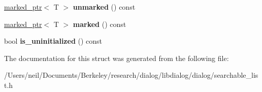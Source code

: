 \begin{DoxyCompactItemize}
\hyperlink{structdialog_1_1marked__ptr}{marked\+\_\+ptr}$<$ T $>$ {\bfseries unmarked} () const
\item 
\mbox{\label{structdialog_1_1marked__ptr_a772a3106d4a350399d2c4324b1361f45}} 
\hyperlink{structdialog_1_1marked__ptr}{marked\+\_\+ptr}$<$ T $>$ {\bfseries marked} () const
\item 
\mbox{\label{structdialog_1_1marked__ptr_aeecc5639da1c80844fbc85a72254f6ad}} 
bool {\bfseries is\+\_\+uninitialized} () const
\end{DoxyCompactItemize}


The documentation for this struct was generated from the following file\+:\begin{DoxyCompactItemize}
\item 
/\+Users/neil/\+Documents/\+Berkeley/research/dialog/libdialog/dialog/searchable\+\_\+list.\+h\end{DoxyCompactItemize}
